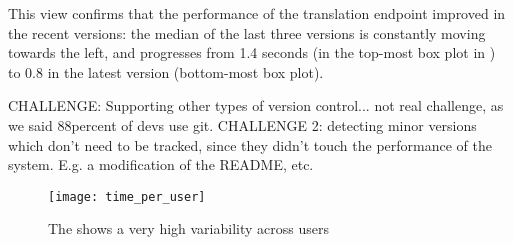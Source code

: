   This view confirms that the performance of the translation endpoint improved in the recent versions: the median of the last three versions is constantly moving towards the left, and progresses from 1.4 seconds (in the top-most box plot in ) to 0.8 in the latest version (bottom-most box plot).



  CHALLENGE: Supporting other types of version control... not real challenge, as we said 88percent of devs use git. 
  CHALLENGE 2: detecting minor versions which don't need to be tracked, since they didn't touch the performance of the system. E.g. a modification of the README, etc. 
  



  

\begin{figure*}[!ht]
  \centering
  \texttt{[image: time\_per\_user]}
  \caption{The \epFeedItems shows a very high variability across users}
  \label{fig:tpu}
\end{figure*}
